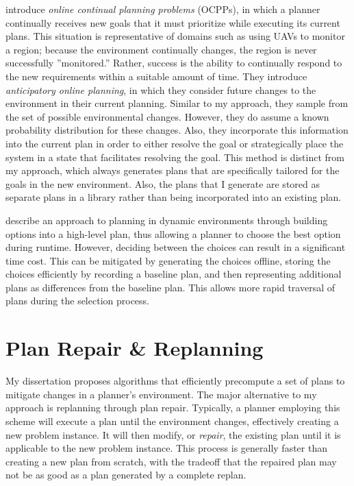 \cite{DBLP:conf/aips/BurnsBRYD12} introduce \textit{online continual planning problems} (OCPPs), in which a planner continually receives new goals that it must prioritize while executing its current plans.  This situation is representative of domains such as using UAVs to monitor a region; because the environment continually changes, the region is never successfully ''monitored.''  Rather, success is the ability to continually respond to the new requirements within a suitable amount of time.  They introduce \textit{anticipatory online planning}, in which they consider future changes to the environment in their current planning.  Similar to my approach, they sample from the set of possible environmental changes.  However, they do assume a known probability distribution for these changes.  Also, they incorporate this information into the current plan in order to either resolve the goal or strategically place the system in a state that facilitates resolving the goal.  This method is distinct from my approach, which always generates plans that are  specifically tailored for the goals in the new environment.  Also, the plans that I generate are stored as separate plans in a library rather than being incorporated into an existing plan.

\cite{DBLP:conf/aips/ConradSW09} describe an approach to planning in dynamic environments through building options into a high-level plan, thus allowing a planner to choose the best option during runtime.  However, deciding between the choices can result in a significant time cost.  This can be mitigated by generating the choices offline, storing the choices efficiently by recording a baseline plan, and then representing additional plans as differences from the baseline plan.  This allows more rapid traversal of plans during the selection process.






\section{Plan Repair \& Replanning}

My dissertation proposes algorithms that efficiently precompute a set of plans to mitigate changes in a planner's environment.  The major alternative to my approach is replanning through plan repair.  Typically, a planner employing this scheme will execute a plan until the environment changes, effectively creating a new problem instance.  It will then modify, or \textit{repair}, the existing plan until it is applicable to the new problem instance.  This process is generally faster than creating a new plan from scratch, with the tradeoff that the repaired plan may not be as good as a plan generated by a complete replan.



